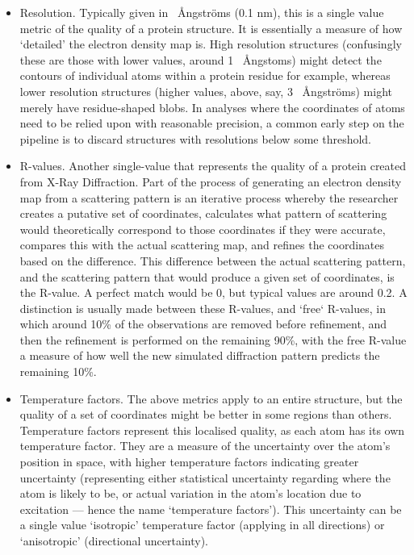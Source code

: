 \begin{itemize}

\item Resolution. Typically given in ~{\AA}ngstr\"{o}ms (0.1 nm), this is a single value metric of the quality of a protein structure. It is essentially a measure of how `detailed' the electron density map is. High resolution structures (confusingly these are those with lower values, around 1 ~{\AA}ngstoms) might detect the contours of individual atoms within a protein residue for example, whereas lower resolution structures (higher values, above, say, 3 ~{\AA}ngstr\"{o}ms) might merely have residue-shaped blobs. In analyses where the coordinates of atoms need to be relied upon with reasonable precision, a common early step on the pipeline is to discard structures with resolutions below some threshold.

\item R-values. Another single-value that represents the quality of a protein created from X-Ray Diffraction. Part of the process of generating an electron density map from a scattering pattern is an iterative process whereby the researcher creates a putative set of coordinates, calculates what pattern of scattering would theoretically correspond to those coordinates if they were accurate, compares this with the actual scattering map, and refines the coordinates based on the difference. This difference between the actual scattering pattern, and the scattering pattern that would produce a given set of coordinates, is the R-value. A perfect match would be 0, but typical values are around 0.2. A distinction is usually made between these R-values, and `free` R-values, in which around 10\% of the observations are removed before refinement, and then the refinement is performed on the remaining 90\%, with the free R-value a measure of how well the new simulated diffraction pattern predicts the remaining 10\%.

\item Temperature factors. The above metrics apply to an entire structure, but the quality of a set of coordinates might be better in some regions than others. Temperature factors represent this localised quality, as each atom has its own temperature factor. They are a measure of the uncertainty over the atom's position in space, with higher temperature factors indicating greater uncertainty (representing either statistical uncertainty regarding where the atom is likely to be, or actual variation in the atom's location due to excitation --- hence the name `temperature factors'). This uncertainty can be a single value `isotropic' temperature factor (applying in all directions) or `anisotropic' (directional uncertainty).


\end{itemize}
